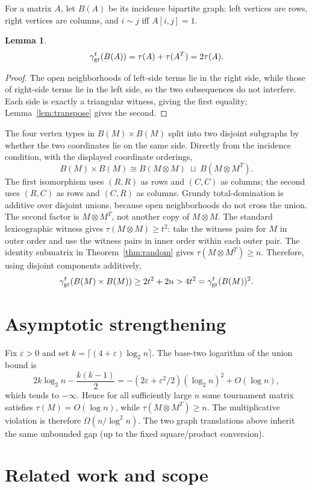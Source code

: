 \documentclass[11pt]{article}
\newtheorem{lemma}[theorem]{Lemma}
\newcommand{\grt}{\gamma_{\rm gr}^{t}}
\newcommand{\timesdir}{\mathbin{\times}}
\begin{document}
For a matrix $A$, let $B(A)$ be its incidence bipartite graph: left vertices
are rows, right vertices are columns, and $i\sim j$ iff $A[i,j]=1$.

\begin{lemma}\label{lem:incidence}
\[
\grt(B(A))=\tau(A)+\tau(A^T)=2\tau(A).
\]
\end{lemma}
\begin{proof}
The open neighborhoods of left-side terms lie in the right side, while those
of right-side terms lie in the left side, so the two subsequences do not
interfere.  Each side is exactly a triangular witness, giving the first
equality; Lemma~\ref{lem:transpose} gives the second.
\end{proof}

The four vertex types in $B(M)\timesdir B(M)$ split into two disjoint
subgraphs by whether the two coordinates lie on the same side.  Directly from
the incidence condition, with the displayed coordinate orderings,
\[
B(M)\timesdir B(M)\cong B(M\otimes M)\;\sqcup\;B(M\otimes M^T).
\]
The first isomorphism uses $(R,R)$ as rows and $(C,C)$ as columns; the second
uses $(R,C)$ as rows and $(C,R)$ as columns.  Grundy total-domination is
additive over disjoint unions, because open neighborhoods do not cross the
union.
The second factor is $M\otimes M^T$, not another copy of $M\otimes M$.
The standard lexicographic witness gives
$\tau(M\otimes M)\ge t^2$: take the witness pairs for $M$ in outer order and
use the witness pairs in inner order within each outer pair.  The identity
submatrix in Theorem~\ref{thm:random} gives
$\tau(M\otimes M^T)\ge n$.  Therefore, using disjoint components additively,
\[
\grt(B(M)\timesdir B(M))
\ge2t^2+2n>4t^2=\grt(B(M))^2.
\]

\section{Asymptotic strengthening}

Fix $\varepsilon>0$ and set
$k=\lceil(4+\varepsilon)\log_2 n\rceil$.  The base-two logarithm of the
union bound is
\[
2k\log_2n-\frac{k(k-1)}2
=-(2\varepsilon+\varepsilon^2/2)(\log_2n)^2+O(\log n),
\]
which tends to $-\infty$.  Hence for all sufficiently large $n$ some
tournament matrix satisfies $\tau(M)=O(\log n)$, while
$\tau(M\otimes M^T)\ge n$.  The multiplicative violation is therefore
$\Omega(n/\log^2n)$.  The two graph translations above inherit the same
unbounded gap (up to the fixed square/product conversion).

\section{Related work and scope}
\end{document}
